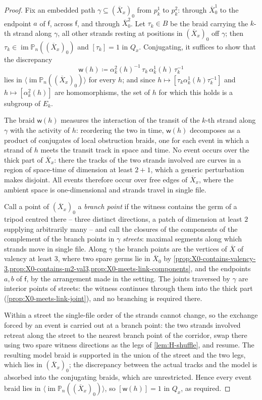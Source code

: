 \documentclass[reqno]{amsart}
\theoremstyle{definition}
\newcommand\sff{\mathsf{f}}
\newcommand\sfw{\mathsf{w}}
\newcommand{\PB}{\mathbb{P}}
\newcommand{\im}{\operatorname{im}}
\newcommand{\co}[1]{\mathopen{\langle}#1\mathclose{\rangle}} %
\renewcommand{\bar}{\overline}
\numberwithin{equation}{section}
\begin{document}
\begin{proof}
Fix an embedded path \(\gamma\subseteq(\bar X_x)_0\) from
\(p^1_k\) to \(p^2_k\): through \(\bar X_0^1\) to the endpoint
\(a\) of \(\sff\), across \(\sff\), and through \(\bar X_0^2\). Let
\(\tau_k\in B\) be the braid carrying the \(k\)-th strand along
\(\gamma\), all other strands resting at positions in
\((\bar X_x)_0\) off \(\gamma\); then
\(\tau_k\in\im\PB_n((\bar X_x)_0)\) and \([\tau_k]=1\) in
\(Q_x\). Conjugating, it suffices to show that the discrepancy
\[
\sfw(h)\coloneqq
\alpha^2_k(h)^{-1}\,\tau_k\,\alpha^1_k(h)\,\tau_k^{-1}
\]
lies in \(\co{\im\PB_n((\bar X_x)_0)}\) for every \(h\); and
since \(h\mapsto[\tau_k\alpha^1_k(h)\tau_k^{-1}]\) and
\(h\mapsto[\alpha^2_k(h)]\) are homomorphisms, the set of
\(h\) for which this holds is a subgroup of \(E_k\).

The braid \(\sfw(h)\) measures the interaction of the transit of
the \(k\)-th strand along \(\gamma\) with the activity of
\(h\): reordering the two in time, \(\sfw(h)\) decomposes as a
product of conjugates of local obstruction braids, one for each
event in which a strand of \(h\) meets the transit track in
space and time. No event occurs over the thick part
of \(\bar X_x\): there the tracks of the two strands involved
are curves in a region of space-time of dimension at least
\(2+1\),
which a generic perturbation makes disjoint. All events
therefore occur over free edges of \(\bar X_x\), where the
ambient space is one-dimensional and strands travel in single
file.

Call a point of \((\bar X_x)_0\) a \emph{branch point} if the
witness contains the germ of a tripod centred there -- three
distinct directions, a patch of dimension at least \(2\)
supplying
arbitrarily many -- and call the closures of the components of
the complement of the branch points in \(\gamma\)
\emph{streets}: maximal segments along which strands move in
single file. Along \(\gamma\) the branch points are the
vertices of \(\bar X\) of valency at least \(3\), where two
spare germs lie in \(\bar X_0\) by
\cref{prop:X0-contains-valency-3,prop:X0-contains-m2-val3,prop:X0-meets-link-components},
and the endpoints \(a,b\) of \(\sff\), by the arrangement made in
the setting. The joints traversed by \(\gamma\) are interior
points of streets: the witness continues through them into the
thick part (\cref{prop:X0-meets-link-joint}), and no branching
is required there.

Within a street the single-file order of the strands cannot
change, so the exchange forced by an event is carried out at a
branch point: the two strands involved retreat along the
street to the nearest branch point of the corridor, swap there
using two spare witness directions as the legs of
\cref{lem:H-shuffle}, and resume. The resulting model braid is
supported in the union of the street and the two legs, which
lies in \((\bar X_x)_0\); the discrepancy between the actual
tracks and the model is absorbed into the conjugating braids,
which are unrestricted. Hence every event braid lies in
\(\co{\im\PB_n((\bar X_x)_0)}\), so \([\sfw(h)]=1\) in \(Q_x\), as
required.
\end{proof}
\end{document}
